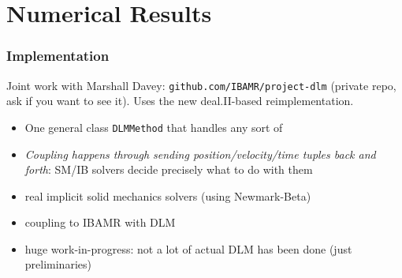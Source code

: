 \documentclass[8pt]{beamer}
\begin{document}
\section{Numerical Results}
\begin{frame}
  \frametitle{Implementation}

  Joint work with Marshall Davey: \texttt{github.com/IBAMR/project-dlm} (private
  repo, ask if you want to see it). Uses the new deal.II-based reimplementation.

    \begin{itemize}
      \item One general class \texttt{DLMMethod} that handles any sort of
      \item \emph{Coupling happens through sending position/velocity/time tuples
      back and forth}: SM/IB solvers decide precisely what to do with them
      \item real implicit solid mechanics solvers (using Newmark-Beta)
      \item coupling to IBAMR with DLM
      \item huge work-in-progress: not a lot of actual DLM has been done (just
        preliminaries)
    \end{itemize}
\end{frame}
\end{document}
